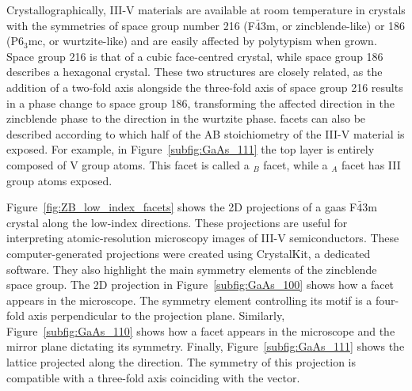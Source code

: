 Crystallographically, III-V materials are available at room temperature in crystals with the symmetries of space group number \num{216} (F\(\bar{4}\)3m, or zincblende-like) or \num{186} (P6\(_3\)mc, or wurtzite-like) and are easily affected by polytypism when grown. Space group \num{216} is that of a cubic face-centred crystal, while space group \num{186} describes a hexagonal crystal. These two structures are closely related, as the addition of a two-fold axis alongside the three-fold axis of space group \num{216} results in a phase change to space group \num{186}, transforming the affected  direction in the zincblende phase to the  direction in the wurtzite phase.  facets can also be described according to which half of the AB stoichiometry of the III-V material is exposed. For example, in Figure~\ref{subfig:GaAs_111} the top layer is entirely composed of V group atoms. This facet is called a \(_B\) facet, while a \(_A\) facet has III group atoms exposed.

Figure~\ref{fig:ZB_low_index_facets} shows the 2D projections of a \acs{gaas} F\(\bar{4}\)3m crystal along the low-index directions. These projections are useful for interpreting atomic-resolution microscopy images of III-V semiconductors. These computer-generated projections were created using CrystalKit, a dedicated software. They also highlight the main symmetry elements of the zincblende space group. The 2D projection in Figure~\ref{subfig:GaAs_100} shows how a  facet appears in the microscope. The symmetry element controlling its motif is a four-fold axis perpendicular to the projection plane. Similarly, Figure~\ref{subfig:GaAs_110} shows how a  facet appears in the microscope and the mirror plane dictating its symmetry. Finally, Figure~\ref{subfig:GaAs_111} shows the lattice projected along the  direction. The symmetry of this projection is compatible with a three-fold axis coinciding with the  vector.

